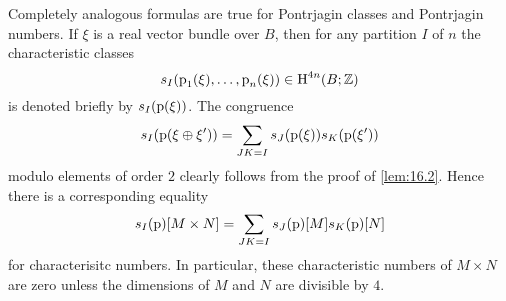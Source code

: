 \documentclass[../main]{subfiles}
\begin{document}
Completely analogous formulas are true for Pontrjagin classes and Pontrjagin numbers. If $\xi$ is a real vector bundle over $B$, then for any partition $I$ of $n$ the characteristic classes \[s_I(\operatorname{p}_1(\xi), \ldots, \operatorname{p}_n(\xi)) \in \operatorname{H}^{4n}(B; \mathbb Z)\] is denoted briefly by $s_I(\operatorname{p}(\xi))$. The congruence \[s_I(\operatorname{p}(\xi \oplus \xi')) = \sum_{JK = I} s_J(\operatorname{p}(\xi)) s_K(\operatorname{p}(\xi'))\] modulo elements of order $2$ clearly follows from the proof of \ref{lem:16.2}. Hence there is a corresponding equality \[s_I(\operatorname{p})[M \times N] = \sum_{JK = I} s_J(\operatorname{p})[M] s_K(\operatorname{p})[N]\] for characterisitc numbers. In particular, these characteristic numbers of $M \times N$ are zero unless the dimensions of $M$ and $N$ are divisible by $4$. 
\end{document}
